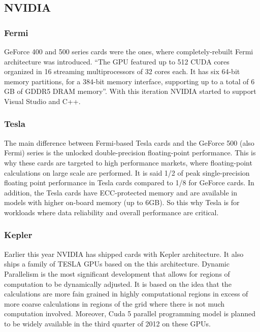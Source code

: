 \subsection{NVIDIA}

\subsubsection{Fermi}
GeForce 400 and 500 series cards were the ones, where completely-rebuilt Fermi architecture was introduced.\cite{nvidia2012fermiwhite} \enquote{The GPU featured up to 512 CUDA cores organized in 16 streaming multiprocessors of 32 cores each. It has six 64-bit memory partitions, for a 384-bit memory interface, supporting up to a total of 6 GB of GDDR5 DRAM memory}. With this iteration NVIDIA started to support Visual Studio and C++.

\subsubsection{Tesla}
The main difference between Fermi-based Tesla cards and the GeForce 500 (also Fermi) series is the unlocked double-precision floating-point performance. This is why these cards are targeted to high performance markets, where floating-point calculations on large scale are performed. It is said 1/2 of peak single-precision floating point performance in Tesla cards compared to 1/8 for GeForce cards. In addition, the Tesla cards have ECC-protected memory and are available in models with higher on-board memory (up to 6GB). So this why Tesla is for workloads where data reliability and overall performance are critical.

\subsubsection{Kepler}
Earlier this year NVIDIA has shipped cards with Kepler architecture.\cite{nvidia2012keplerwhite} It also ships a family of TESLA GPUs based on the this architecture. Dynamic Parallelism is the most significant development that allows for regions of computation to be dynamically adjusted. It is based on the idea that the calculations are more fain grained in highly computational regions in excess of more coarse calculations in regions of the grid where there is not much computation involved. Moreover, Cuda 5 parallel programming model is planned to be widely available in the third quarter of 2012 on these GPUs.\cite{kepler2012news1, kepler2012news2}

